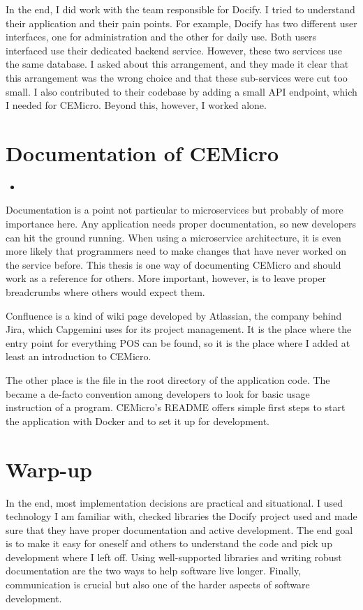 In the end, I did work with the team responsible for Docify. I tried to understand their application and their pain points. For example, Docify has two different user interfaces, one for administration and the other for daily use. Both users interfaced use their dedicated backend service. However, these two services use the same database. I asked about this arrangement, and they made it clear that this arrangement was the wrong choice and that these sub-services were cut too small. I also contributed to their codebase by adding a small API endpoint, which I needed for CEMicro. Beyond this, however, I worked alone.


\section{Documentation of CEMicro}

\begin{itemize}
  \item {}
\end{itemize}

Documentation is a point not particular to microservices but probably of more importance here. Any application needs proper documentation, so new developers can hit the ground running. When using a microservice architecture, it is even more likely that programmers need to make changes that have never worked on the service before. This thesis is one way of documenting CEMicro and should work as a reference for others. More important, however, is to leave proper breadcrumbs where others would expect them.

Confluence is a kind of wiki page developed by Atlassian, the company behind Jira, which Capgemini uses for its project management. It is the place where the entry point for everything POS can be found, so it is the place where I added at least an introduction to CEMicro.

The other place is the  file in the root directory of the application code. The  became a de-facto convention among developers to look for basic usage instruction of a program. CEMicro's README offers simple first steps to start the application with Docker and to set it up for development.


\section{Warp-up}

In the end, most implementation decisions are practical and situational. I used technology I am familiar with, checked libraries the Docify project used and made sure that they have proper documentation and active development. The end goal is to make it easy for oneself and others to understand the code and pick up development where I left off. Using well-supported libraries and writing robust documentation are the two ways to help software live longer. Finally, communication is crucial but also one of the harder aspects of software development.



